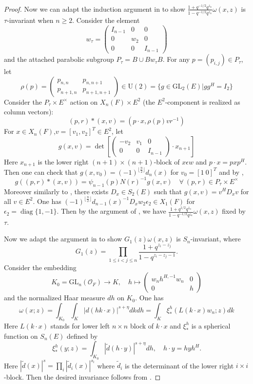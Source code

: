 \documentclass{amsart}
\theoremstyle{definition}
\theoremstyle{remark}
\newcommand{\1}{\mathbf{1}}
\newcommand{\GL}{\mathrm{GL}}
\newcommand{\U}{\mathrm{U}}
\DeclareMathOperator{\diag}{diag}
\theoremstyle{definition}
\newcommand{\CO}{{\mathcal {O}}}
\begin{document}
\begin{proof}
Now  we can adapt the induction argument in \cite[Thm 2.3]{HK14} to show $\frac{1+q^{-1/2}q^{z_n}}{1-q^{-1/2}q^{z_n}} \omega(x,z)$ is $\tau$-invariant when $n\geq2$. Consider the element \[w_\tau=\begin{pmatrix} I_{n-1} & 0 & 0
\\ 0 & w_2 & 0\\ 0 & 0 & I_{n-1}\end{pmatrix}\]
and the attached parabolic subgroup $P_\tau=B\cup B w_\tau B$. For any $p=(p_{i,j})\in P_\tau$, let \[\rho(p)=\begin{pmatrix} p_{n,n} & p_{n,n+1}\\ p_{n+1,n} & p_{n+1,n+1}\end{pmatrix}\in \U(2)=\{g\in \GL_2(E)| gg^H=I_2\}\]
Consider the $P_\tau\times E^\times$ action on $X_n(F)\times E^2$ (the $E^2$-component is realized as column vectors):
\[(p,r)\ast (x,v)=(p\cdot x, \rho(p) v r^{-1})\]
For $x\in X_n(F)$,$v=[v_1, v_2]^T\in E^2$, let  \[g(x,v)=\det \left[\begin{pmatrix} -v_2 & v_1 & 0\\ 0 & 0 & I_{n-1}\end{pmatrix}\cdot x_{n+1}\right]\]
Here $x_{n+1}$ is the lower right $(n+1)\times (n+1)$-block of $x\epsilon w$ and $p\cdot x=pxp^H$. Then one can check that 
$g(x,v_0)=(-1)^{\lfloor \frac{n}{2}\rfloor}d_n(x)$ for $v_0=[1\ 0]^T$ and by \cite[Lemma 2.5(i)]{HK14}, \[g((p,r)\ast (x,v))=\psi_{n-1}(p)N(r)^{-1}g(x,v)\quad \forall\ (p,r)\in P_\tau\times E^\times\]
Moreover similarly to \cite[Lemma 2.5(ii)]{HK14}, there exists $D_x\in S_2(E)$ such that $g(x,v)=v^HD_x v$ for all $v\in E^2$. One has
$(-1)^{\lfloor \frac{n}{2}\rfloor}d_{n-1}(x)^{-1}D_x w_2\epsilon_2\in X_1(F)$ for $\epsilon_2=\diag\{1,-1\}$.  Then by the argument of \cite[Theorem 2.3]{HK14}, we have $\frac{1+q^{1/2}q^{z_n}}{1-q^{-1/2}q^{z_n}} \omega(x,z)$ fixed by $\tau$.


Now we adapt the argument in \cite[Thm 2.1]{HK14} to show $G_1(z)\omega(x,z)$ is $S_n$-invariant, where
 \[G_1(z)=\prod_{1\leq i<j\leq n}\frac{1+q^{z_i-z_j}}{1-q^{z_i-z_j-1}}.\]
 Consider the embedding \[K_0=\GL_n(\CO_F)\to K,\quad h\mapsto \begin{pmatrix} w_n h^{H,-1}w_n & 0\\ 0 & h\end{pmatrix}\]
and the normalized Haar measure $dh$ on $K_0$. 
One has \[\omega(x;z)=\int_{K_0} \int_K |d(hk\cdot x)|^{s+\eta}dkdh=\int_K \xi_*^h(L(k\cdot x)w_n;z)dk\] 
Here $L(k\cdot x)$ stands for lower left $n\times n$ block of $k\cdot x$ and $\xi_*^h$ is a spherical function on $S_n(E)$ defined by 
\[\xi_*^h(y;z)=\int_{K_0}|\tilde{d}(h\cdot y)|^{s+\eta}dh,\quad h\cdot y=hyh^H.\]
Here $|\tilde{d}(x)|^s=\prod_i|\tilde{d}_i(x)|^{s_i}$ where $\tilde{d}_i$ is the determinant of the lower right $i\times i$-block. Then the desired invariance follows from \cite[Proposition 2.2]{HK14}.


\end{proof}
\end{document}
